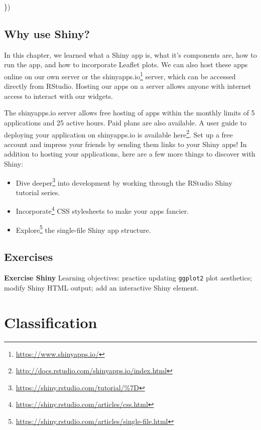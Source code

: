 \documentclass[
]{krantz}
\makeatletter
\newenvironment{Shaded}{\begin{snugshade}}{\end{snugshade}}
\newcommand{\NormalTok}[1]{#1}
\providecommand{\tightlist}{%
  \setlength{\itemsep}{0pt}\setlength{\parskip}{0pt}}
\renewcommand{\href}[2]{#2\footnote{\url{#1}}}
\newenvironment{kframe}{%
\medskip{}
\setlength{\fboxsep}{.8em}
 \def\at@end@of@kframe{}%
 \ifinner\ifhmode%
  \def\at@end@of@kframe{\end{minipage}}%
  \begin{minipage}{\columnwidth}%
 \fi\fi%
 \def\FrameCommand##1{\hskip\@totalleftmargin \hskip-\fboxsep
 \colorbox{shadecolor}{##1}\hskip-\fboxsep
     \hskip-\linewidth \hskip-\@totalleftmargin \hskip\columnwidth}%
 \MakeFramed {\advance\hsize-\width
   \@totalleftmargin\z@ \linewidth\hsize
   \@setminipage}}%
 {\par\unskip\endMakeFramed%
 \at@end@of@kframe}
\renewenvironment{Shaded}{\begin{kframe}}{\end{kframe}}
\makeatother
\begin{document}
\begin{Shaded}
\begin{Highlighting}[]
\NormalTok{  \})}
\end{Highlighting}
\end{Shaded}

\hypertarget{why-use-shiny}{%
\section{Why use Shiny?}\label{why-use-shiny}}

In this chapter, we learned what a Shiny app is, what it's components are, how to run the app, and how to incorporate Leaflet plots. We can also host these apps online on our own server or the \href{https://www.shinyapps.io/}{shinyapps.io} server, which can be accessed directly from RStudio. Hosting our apps on a server allows anyone with internet access to interact with our widgets.

The shinyapps.io server allows free hosting of apps within the monthly limits of 5 applications and 25 active hours. Paid plans are also available. A user guide to deploying your application on shinyapps.io is available \href{http://docs.rstudio.com/shinyapps.io/index.html}{here}. Set up a free account and impress your friends by sending them links to your Shiny apps! In addition to hosting your applications, here are a few more things to discover with Shiny:

\begin{itemize}
\tightlist
\item
  \href{https://shiny.rstudio.com/tutorial/\%7D}{Dive deeper} into development by working through the RStudio Shiny tutorial series.
\item
  \href{https://shiny.rstudio.com/articles/css.html}{Incorporate} CSS stylesheets to make your apps fancier.
\item
  \href{https://shiny.rstudio.com/articles/single-file.html}{Explore} the single-file Shiny app structure.
\end{itemize}

\hypertarget{exercises-6}{%
\section{Exercises}\label{exercises-6}}

\textbf{Exercise Shiny} Learning objectives: practice updating \texttt{ggplot2} plot aesthetics; modify Shiny HTML output; add an interactive Shiny element.

\hypertarget{classification}{%
\chapter{Classification}\label{classification}}
\end{document}
